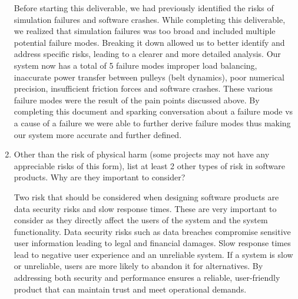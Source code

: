 \documentclass{article}
\begin{document}
\begin{enumerate}
    Before starting this deliverable, we had previously identified the risks of simulation failures and software crashes. 
    While completing this deliverable, we realized that simulation failures was too broad and included multiple potential failure modes. 
    Breaking it down allowed us to better identify and address specific risks, leading to a clearer and more detailed analysis.  
    Our system now has a total of 5 failure modes improper load balancing, inaccurate power transfer between pulleys (belt dynamics), poor numerical precision, insufficient friction forces and software crashes. 
    These various failure modes were the result of the pain points discussed above. 
    By completing this document and sparking conversation about a failure mode vs a cause of a failure we were able to further derive failure modes thus making our system more accurate and further defined. 

    \item Other than the risk of physical harm (some projects may not have any
    appreciable risks of this form), list at least 2 other types of risk in
    software products. Why are they important to consider?

    Two risk that should be considered when designing software products are data security risks and slow response times.  
    These are very important to consider as they directly affect the users of the system and the system functionality.  
    Data security risks such as data breaches compromise sensitive user information leading to legal and financial damages. 
    Slow response times lead to negative user experience and an unreliable system. 
    If a system is slow or unreliable, users are more likely to abandon it for alternatives. 
    By addressing both security and performance ensures a reliable, user-friendly product that can maintain trust and meet operational demands.
\end{enumerate}
\end{document}
